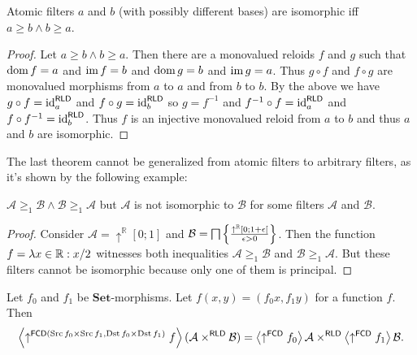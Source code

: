 \begin{thm}
Atomic filters $a$ and $b$ (with possibly different bases) are isomorphic
iff $a\ge b\land b\ge a$.\end{thm}
\begin{proof}
Let $a\ge b\land b\ge a$. Then there are a monovalued reloids $f$
and $g$ such that $\operatorname{dom} f=a$ and $\operatorname{im} f=b$ and $\operatorname{dom} g=b$ and
$\operatorname{im} g=a$. Thus $g\circ f$ and $f\circ g$ are monovalued morphisms
from $a$ to $a$ and from $b$ to $b$. By the above we have $g\circ f={\operatorname{id}}_{a}^{\mathsf{RLD}}$
and $f\circ g={\operatorname{id}}_{b}^{\mathsf{RLD}}$ so $g=f^{-1}$ and $f^{-1}\circ f={\operatorname{id}}_{a}^{\mathsf{RLD}}$
and $f\circ f^{-1}={\operatorname{id}}_{b}^{\mathsf{RLD}}$. Thus $f$ is an injective
monovalued reloid from $a$ to $b$ and thus $a$ and $b$ are isomorphic.
\end{proof}
The last theorem cannot be generalized from atomic filters to arbitrary
filters, as it's shown by the following example:
\begin{example}
$\mathcal{A}\ge_{1}\mathcal{B}\wedge\mathcal{B}\ge_{1}\mathcal{A}$
but $\mathcal{A}$ is not isomorphic to $\mathcal{B}$ for some filters
$\mathcal{A}$ and $\mathcal{B}$.\end{example}
\begin{proof}
Consider $\mathcal{A}=\uparrow^{\mathbb{R}}[0;1]$ and $\mathcal{B}=\bigsqcap\left\{ \frac{\uparrow^{\mathbb{R}}[0;1+\epsilon[}{\epsilon>0}\right\}$.
Then the function $f=\lambda x\in\mathbb{R}:x/2$ witnesses both
inequalities $\mathcal{A}\ge_{1}\mathcal{B}$ and $\mathcal{B}\ge_{1}\mathcal{A}$.
But these filters cannot be isomorphic because only one of them is
principal.\end{proof}
\begin{lem}
Let $f_{0}$ and $f_{1}$ be $\mathbf{Set}$-morphisms. Let $f(x,y)=(f_{0}x,f_{1}y)$
for a function $f$. Then
\[
\left\langle \uparrow^{\mathsf{FCD}(\operatorname{Src} f_{0}\times\operatorname{Src} f_{1},\operatorname{Dst} f_{0}\times\operatorname{Dst} f_{1})}f\right\rangle(\mathcal{A}\times^{\mathsf{RLD}}\mathcal{B})=\left\langle \uparrow^{\mathsf{FCD}}f_{0}\right\rangle\mathcal{A}\times^{\mathsf{RLD}}\left\langle \uparrow^{\mathsf{FCD}}f_{1}\right\rangle\mathcal{B}.
\]
\end{lem}
